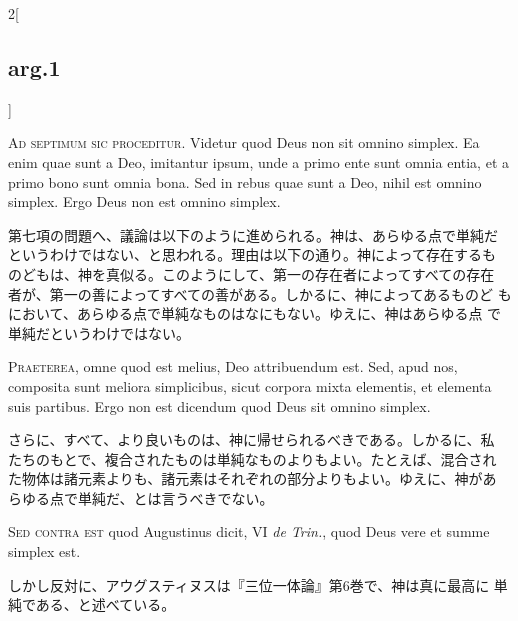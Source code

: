 \documentclass[paper=a4paper,fontsize=10pt,jafontsize=9pt,titlepage]{jlreq}
\begin{document}
\begin{paracol}{2}[\subsection{arg.1}]

{\huge A}{\scshape d septimum sic proceditur}. Videtur quod Deus non
 sit omnino simplex. Ea enim quae sunt a Deo, imitantur ipsum, unde a
 primo ente sunt omnia entia, et a primo bono sunt omnia bona. Sed in
 rebus quae sunt a Deo, nihil est omnino simplex. Ergo Deus non est
 omnino simplex.

\switchcolumn

第七項の問題へ、議論は以下のように進められる。神は、あらゆる点で単純だ
というわけではない、と思われる。理由は以下の通り。神によって存在するも
のどもは、神を真似る。このようにして、第一の存在者によってすべての存在
者が、第一の善によってすべての善がある。しかるに、神によってあるものど
もにおいて、あらゆる点で単純なものはなにもない。ゆえに、神はあらゆる点
で単純だというわけではない。


{\scshape Praeterea}, omne quod est melius, Deo attribuendum est. Sed,
 apud nos, composita sunt meliora simplicibus, sicut corpora mixta
 elementis, et elementa suis partibus. Ergo non est dicendum quod Deus
 sit omnino simplex.

\switchcolumn

さらに、すべて、より良いものは、神に帰せられるべきである。しかるに、私
たちのもとで、複合されたものは単純なものよりもよい。たとえば、混合され
た物体は諸元素よりも、諸元素はそれぞれの部分よりもよい。ゆえに、神があ
らゆる点で単純だ、とは言うべきでない。

\switchcolumn*[\subsection{s.c.}]

{\scshape Sed contra est} quod Augustinus dicit, VI {\itshape de
 Trin.}, quod Deus vere et summe simplex est.

\switchcolumn

しかし反対に、アウグスティヌスは『三位一体論』第6巻で、神は真に最高に
単純である、と述べている。



\end{paracol}
\end{document}
